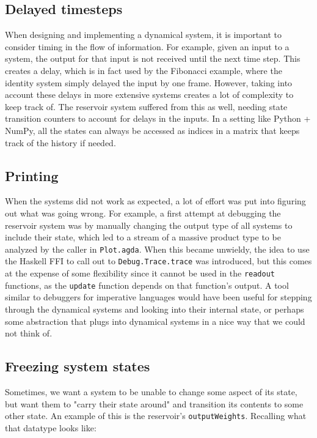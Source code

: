\subsection{Delayed timesteps}
When designing and implementing a dynamical system, it is important to consider timing in the flow of information. For example, given an input to a system, the output for that input is not received until the next time step. This creates a delay, which is in fact used by the Fibonacci example, where the identity system simply delayed the input by one frame. However, taking into account these delays in more extensive systems creates a lot of complexity to keep track of. The reservoir system suffered from this as well, needing state transition counters to account for delays in the inputs. In a setting like Python + NumPy, all the states can always be accessed as indices in a matrix that keeps track of the history if needed.

\subsection{Printing}
When the systems did not work as expected, a lot of effort was put into figuring out what was going wrong. For example, a first attempt at debugging the reservoir system was by manually changing the output type of all systems to include their state, which led to a stream of a massive product type to be analyzed by the caller in \texttt{Plot.agda}. When this became unwieldy, the idea to use the Haskell FFI to call out to \texttt{Debug.Trace.trace} was introduced, but this comes at the expense of some flexibility since it cannot be used in the \texttt{readout} functions, as the \texttt{update} function depends on that function's output. A tool similar to debuggers for imperative languages would have been useful for stepping through the dynamical systems and looking into their internal state, or perhaps some abstraction that plugs into dynamical systems in a nice way that we could not think of.

\subsection{Freezing system states}
Sometimes, we want a system to be unable to change some aspect of its state, but want them to "carry their state around" and transition its contents to some other state. An example of this is the reservoir's \texttt{outputWeights}. Recalling what that datatype looks like:

